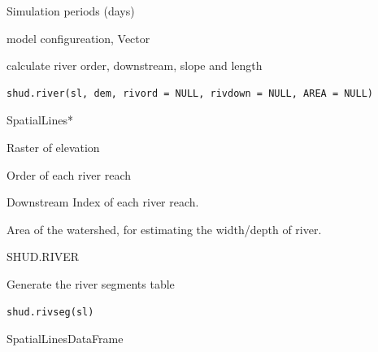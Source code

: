 \documentclass[a4paper]{book}
\begin{document}
%
\begin{Arguments}
\begin{ldescription}
\item[\code{nday}] Simulation periods (days)
\end{ldescription}
\end{Arguments}
%
\begin{Value}
model configureation, Vector
\end{Value}
%
\begin{Description}\relax
calculate river order, downstream, slope and length
\end{Description}
%
\begin{Usage}
\begin{verbatim}
shud.river(sl, dem, rivord = NULL, rivdown = NULL, AREA = NULL)
\end{verbatim}
\end{Usage}
%
\begin{Arguments}
\begin{ldescription}
\item[\code{sl}] SpatialLines*

\item[\code{dem}] Raster of elevation

\item[\code{rivord}] Order of each river reach

\item[\code{rivdown}] Downstream Index of each river reach.

\item[\code{AREA}] Area of the watershed, for estimating the width/depth of river.
\end{ldescription}
\end{Arguments}
%
\begin{Value}
SHUD.RIVER
\end{Value}
%
\begin{Description}\relax
Generate the river segments table
\end{Description}
%
\begin{Usage}
\begin{verbatim}
shud.rivseg(sl)
\end{verbatim}
\end{Usage}
%
\begin{Arguments}
\begin{ldescription}
\item[\code{sl}] SpatialLinesDataFrame
\end{ldescription}
\end{Arguments}
\end{document}
